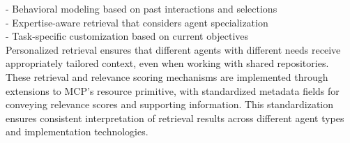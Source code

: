 - Behavioral modeling based on past interactions and selections\\ \newline
- Expertise-aware retrieval that considers agent specialization\\ \newline
- Task-specific customization based on current objectives\\ \newline
Personalized retrieval ensures that different agents with different needs receive appropriately tailored context, even when working with shared repositories.\\ \newline
These retrieval and relevance scoring mechanisms are implemented through extensions to MCP's resource primitive, with standardized metadata fields for conveying relevance scores and supporting information. This standardization ensures consistent interpretation of retrieval results across different agent types and implementation technologies.\\
